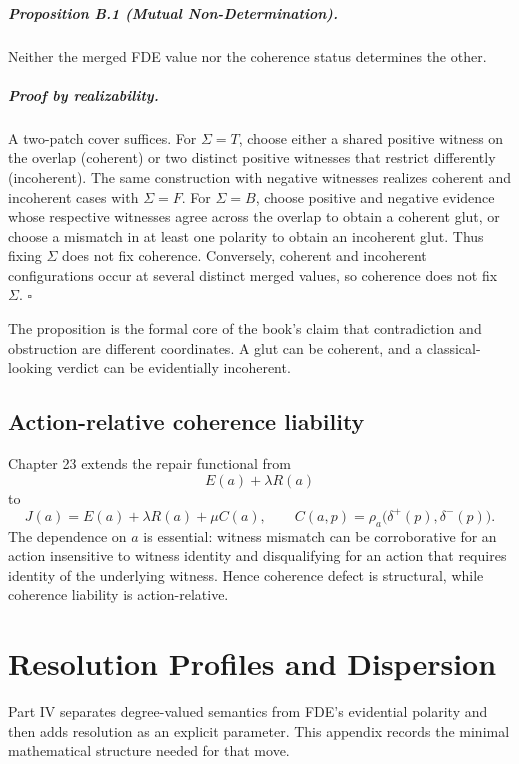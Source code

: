 \paragraph{Proposition B.1 (Mutual Non-Determination).}
Neither the merged FDE value nor the coherence status determines the other.

\paragraph{Proof by realizability.}
A two-patch cover suffices. For $\Sigma=T$, choose either a shared positive witness on the overlap (coherent) or two distinct positive witnesses that restrict differently (incoherent). The same construction with negative witnesses realizes coherent and incoherent cases with $\Sigma=F$. For $\Sigma=B$, choose positive and negative evidence whose respective witnesses agree across the overlap to obtain a coherent glut, or choose a mismatch in at least one polarity to obtain an incoherent glut. Thus fixing $\Sigma$ does not fix coherence. Conversely, coherent and incoherent configurations occur at several distinct merged values, so coherence does not fix $\Sigma$. \hfill$\square$

The proposition is the formal core of the book's claim that contradiction and obstruction are different coordinates. A glut can be coherent, and a classical-looking verdict can be evidentially incoherent.

\section*{Action-relative coherence liability}
Chapter 23 extends the repair functional from
\[
E(a)+\lambda R(a)
\]
to
\[
J(a)=E(a)+\lambda R(a)+\mu C(a),
\qquad
C(a,p)=\rho_a\bigl(\delta^+(p),\delta^-(p)\bigr).
\]
The dependence on $a$ is essential: witness mismatch can be corroborative for an action insensitive to witness identity and disqualifying for an action that requires identity of the underlying witness. Hence coherence defect is structural, while coherence liability is action-relative.

\chapter{Resolution Profiles and Dispersion}
\label{app:dispersion}

Part IV separates degree-valued semantics from FDE's evidential polarity and then adds resolution as an explicit parameter. This appendix records the minimal mathematical structure needed for that move.

